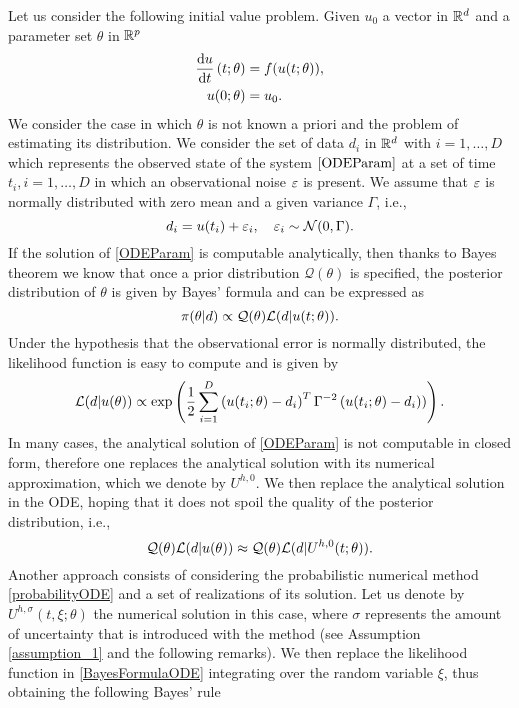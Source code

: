 Let us consider the following initial value problem. Given $u_0$ a vector in $\mathbb{R}^d$ and a parameter set $\theta$ in $\mathbb{R}^p$
\begin{equation}\label{ODEParam}
\begin{aligned}
	\dv{u}{t}\left(t; \theta\right) &= f(u(t;\theta)),\\
	u(0; \theta) &= u_0.
\end{aligned}
\end{equation}
We consider the case in which $\theta$ is not known a priori and the problem of estimating its distribution. We consider the set of data $d_i$ in $\mathbb{R}^d$ with $i = 1, \ldots, D$ which represents the observed state of the system $\eqref{ODEParam}$ at a set of time $t_i, i = 1, \ldots, D$ in which an observational noise $\varepsilon$ is present. We assume that $\varepsilon$ is normally distributed with zero mean and a given variance $\Gamma$, i.e.,
\begin{equation}
	d_i = u(t_i) + \varepsilon_i, \quad \varepsilon_i \sim \mathcal{N}(0, \Gamma).
\end{equation} 
If the solution of \eqref{ODEParam} is computable analytically, then thanks to Bayes theorem we know that once a prior distribution $\mathcal{Q}(\theta)$ is specified, the posterior distribution of $\theta$ is given by Bayes' formula and can be expressed as
\begin{equation}\label{BayesFormulaODE}
	\pi(\theta|d) \propto \mathcal{Q}(\theta) \mathcal{L}(d|u(t;\theta)).
\end{equation}
 Under the hypothesis that the observational error is normally distributed, the likelihood function is easy to compute and is given by
 \begin{equation}\label{likelihood}
	 \mathcal{L}(d|u(\theta)) \propto \exp\left(\frac{1}{2}\sum_{i=1}^{D}\left(u(t_i;\theta) - d_i\right)^T \Gamma^{-2} \left(u(t_i;\theta) - d_i) \right)\right).
 \end{equation}
 In many cases, the analytical solution of \eqref{ODEParam} is not computable in closed form, therefore one replaces the analytical solution with its numerical approximation, which we denote by $U^{h,0}$. We then replace the analytical solution in the ODE, hoping that it does not spoil the quality of the posterior distribution, i.e.,
 \begin{equation}
	 \mathcal{Q}(\theta) \mathcal{L}(d|u(\theta)) \approx \mathcal{Q}(\theta) \mathcal{L}(d|U^{h,0}(t;\theta)).
 \end{equation}
 Another approach consists of considering the probabilistic numerical method \eqref{probabilityODE} and a set of realizations of its solution. Let us denote by $U^{h, \sigma}(t, \xi; \theta)$ the numerical solution in this case, where $\sigma$ represents the amount of uncertainty that is introduced with the method (see Assumption \ref{assumption_1} and the following remarks). We then replace the likelihood function in \eqref{BayesFormulaODE} integrating over the random variable $\xi$, thus obtaining the following Bayes' rule
